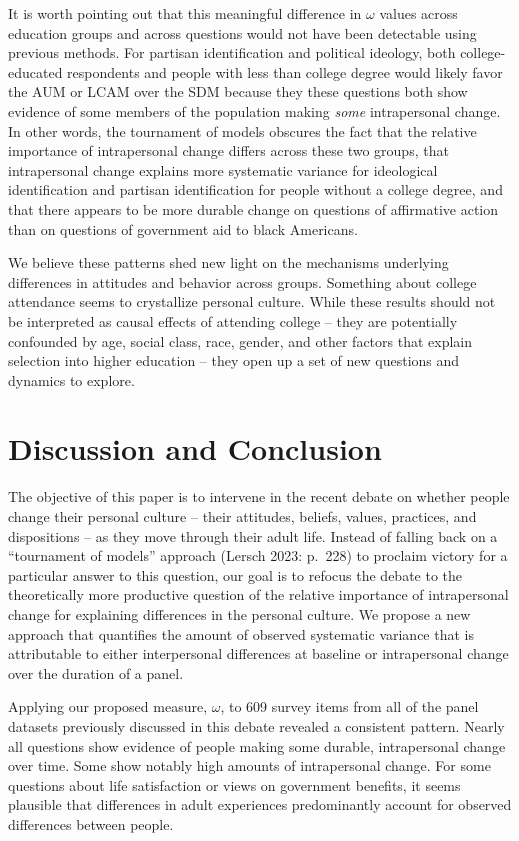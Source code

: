 \documentclass[
  12pt,
]{article}
\begin{document}
It is worth pointing out that this meaningful difference in \(\omega\)
values across education groups and across questions would not have been
detectable using previous methods. For partisan identification and
political ideology, both college-educated respondents and people with
less than college degree would likely favor the AUM or LCAM over the SDM
because they these questions both show evidence of some members of the
population making \emph{some} intrapersonal change. In other words, the
tournament of models obscures the fact that the relative importance of
intrapersonal change differs across these two groups, that intrapersonal
change explains more systematic variance for ideological identification
and partisan identification for people without a college degree, and
that there appears to be more durable change on questions of affirmative
action than on questions of government aid to black Americans.

We believe these patterns shed new light on the mechanisms underlying
differences in attitudes and behavior across groups. Something about
college attendance seems to crystallize personal culture. While these
results should not be interpreted as causal effects of attending college
-- they are potentially confounded by age, social class, race, gender,
and other factors that explain selection into higher education -- they
open up a set of new questions and dynamics to explore.

\hypertarget{discussion-and-conclusion}{%
\section{Discussion and Conclusion}\label{discussion-and-conclusion}}

The objective of this paper is to intervene in the recent debate on
whether people change their personal culture -- their attitudes,
beliefs, values, practices, and dispositions -- as they move through
their adult life. Instead of falling back on a ``tournament of models''
approach (Lersch 2023: p.~228) to proclaim victory for a particular
answer to this question, our goal is to refocus the debate to the
theoretically more productive question of the relative importance of
intrapersonal change for explaining differences in the personal culture.
We propose a new approach that quantifies the amount of observed
systematic variance that is attributable to either interpersonal
differences at baseline or intrapersonal change over the duration of a
panel.

Applying our proposed measure, \(\omega\), to 609 survey items from all
of the panel datasets previously discussed in this debate revealed a
consistent pattern. Nearly all questions show evidence of people making
some durable, intrapersonal change over time. Some show notably high
amounts of intrapersonal change. For some questions about life
satisfaction or views on government benefits, it seems plausible that
differences in adult experiences predominantly account for observed
differences between people.
\end{document}
